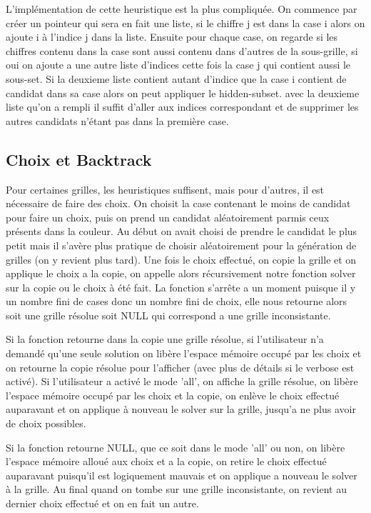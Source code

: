 \documentclass[11pt,a4paper]{article}
\begin{document}
\hspace{10}
L'implémentation de cette heuristique est la plus compliquée. On commence par créer un pointeur qui sera en fait une liste, si le chiffre j est dans la case i alors on ajoute i à l'indice j dans la liste. 
Ensuite pour chaque case, on regarde si les chiffres contenu dans la case sont aussi contenu dans d'autres de la sous-grille, si oui on ajoute a une autre liste d'indices cette fois la case j qui contient aussi le sous-set. Si la deuxieme liste contient autant d'indice que la case i contient de candidat dans sa case alors on peut appliquer le hidden-subset. avec la deuxieme liste qu'on a rempli il suffit d'aller aux indices correspondant et de supprimer les autres candidats n'étant pas dans la première case.



\subsection{Choix et Backtrack}
\hspace{10} 
Pour certaines grilles, les heuristiques suffisent, mais pour d'autres, il est nécessaire de faire des choix. On choisit la case contenant le moins de candidat pour faire un choix, puis on prend un candidat aléatoirement parmis ceux présents dans la couleur. Au début on avait choisi de prendre le candidat le plus petit mais il s'avère plus pratique de choisir aléatoirement pour la génération de grilles (on y revient plus tard). Une fois le choix effectué, on copie la grille et on applique le choix a la copie, on appelle alors récursivement notre fonction solver sur la copie ou le choix à été fait. La fonction s'arrête a un moment puisque il y un nombre fini de cases donc un nombre fini de choix, elle nous retourne alors soit une grille résolue soit NULL qui correspond a une grille inconsistante. 

\hspace{10}
Si la fonction retourne dans la copie une grille résolue, si l'utilisateur n'a demandé qu'une seule solution on libère l'espace mémoire occupé par les choix et on retourne la copie résolue pour l'afficher (avec plus de détails si le verbose est activé). Si l'utilisateur a activé le mode 'all', on affiche la grille résolue, on libère l'espace mémoire occupé par les choix et la copie, on enlève le choix effectué auparavant et on applique à nouveau le solver sur la grille, jusqu'a ne plus avoir de choix possibles.

\hspace{10}
Si la fonction retourne NULL, que ce soit dans le mode 'all' ou non, on libère l'espace mémoire alloué aux choix et a la copie, on retire le choix effectué auparavant puisqu'il est logiquement mauvais et on applique a nouveau le solver à la grille. Au final quand on tombe sur une grille inconsistante, on revient au dernier choix effectué et on en fait un autre.
\end{document}
